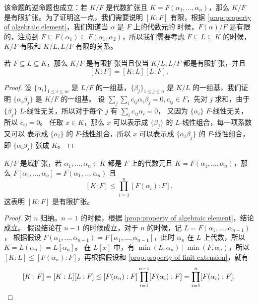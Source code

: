 该命题的逆命题也成立：若 $K/F$ 是代数扩张且 $K=F(\alpha_1,\dots,\alpha_n)$，那么
$K/F$ 是有限扩张。为了证明这一点，我们需要说明 $[K:F]$ 有限，根据
\autoref{prop:property of algebraic element}，我们知道当 $\alpha$ 是 $F$ 上的代数元的
时候，$F(\alpha)/F$ 是有限的，注意到
$F\subseteq F(\alpha_1)\subseteq F(\alpha_1,\alpha_2)$，所以我们需要考虑 $F\subseteq L\subseteq K$ 的时候，
$K/F$ 有限和 $K/L,L/F$ 有限的关系。

\begin{proposition}\label{prop:property of finit extension}
  若 $F\subseteq L\subseteq K$，那么 $K/F$ 是有限扩张当且仅当 $K/L,L/F$ 都是有限扩张，并且
  \[
    [K:F]=[K:L][L:F].  
  \]
\end{proposition}
\begin{proof}
  设 $\{\alpha_i\}_{1\leq i\leq m}$ 是 $L/F$ 的一组基，$\{\beta_j\}_{1\leq j\leq n}$
  是 $K/L$ 的一组基，我们证明 $\{\alpha_i\beta_j\}$ 是 $K/F$ 的一组基。
  设 $\sum_j\sum_i c_{ij}\alpha_i\beta_j=0,c_{ij}\in F$，先对 $j$ 求和，由于
  $\{\beta_j\}$ $L$-线性无关，所以对于每个 $j$ 有 $\sum_i c_{ij}\alpha_i=0$，
  又因为 $\{\alpha_i\}$ $F$-线性无关，所以 $c_{ij}=0$。
  任取 $x\in K$，那么 $x$ 可以表示成 $\{\beta_j\}$ 的 $L$-线性组合，每一项系数又可以
  表示成 $\{\alpha_i\}$ 的 $F$-线性组合，所以 $x$ 可以表示成 $\{\alpha_i\beta_j\}$
  的 $F$-线性组合，即 $\{\alpha_i\beta_j\}$ 张成 $K$。
\end{proof}

\begin{proposition}\label{prop:property of finitly generated extension}
  $K/F$ 是域扩张，若 $\alpha_1,\dots,\alpha_n\in K$ 都是 $F$ 上的代数元且
  $K=F(\alpha_1,\dots,\alpha_n)$，那么 $F[\alpha_1,\dots,\alpha_n]=F(\alpha_1,\dots,\alpha_n)$
  且
  \[
    [K:F]\leq \prod_{i=1}^n [F(\alpha_i):F].  
  \]
  这表明 $[K:F]$ 是有限扩张。
\end{proposition}
\begin{proof}
  对 $n$ 归纳。$n=1$ 的时候，根据 \autoref{prop:property of algebraic element}，结论成立。
  假设结论在 $n-1$ 的时候成立，对于 $n$ 的时候，记 $L=F(\alpha_1,\dots,\alpha_{n-1})$，
  根据假设 $F(\alpha_1,\dots,\alpha_{n-1})=F[\alpha_1,\dots,\alpha_{n-1}]$，此时
  $\alpha_n$ 在 $L$ 上代数，所以 $K=L(\alpha_n)=L[\alpha_n]$。
  在 $L[x]$ 中，有 $\min(L,\alpha_n)\mid \min(F,\alpha_n)$，所以
  $[K:L]\leq [F(\alpha_n):F]$，再根据假设和 \autoref{prop:property of finit extension}，就有
  \[
    [K:F] =[K:L][L:F]\leq [F(\alpha_n):F]\prod_{i=1}^{n-1}[F(\alpha_i):F]
    =\prod_{i=1}^n [F(\alpha_i):F].\qedhere
  \]
\end{proof}

